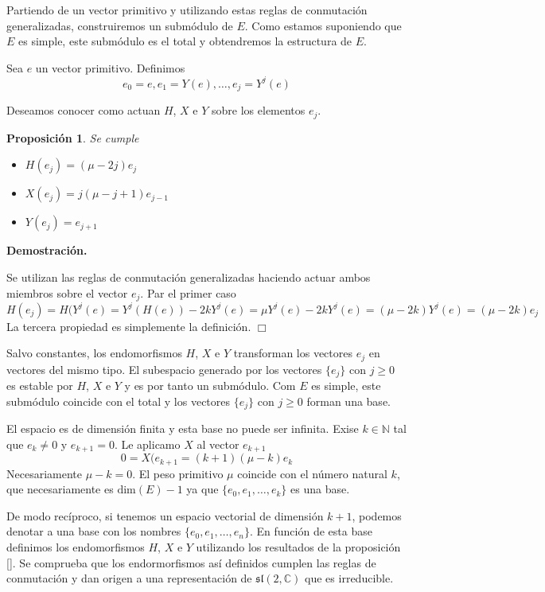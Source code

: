 \documentclass[a4paper,draft,12pt]{scrartcl}
\newtheorem{propo}[teo]{Proposición}%
\newcommand{\dem}{\noindent \textbf{Demostración. }\vspace{0.3 cm}}%
\newcommand{\C}{\mathbb{C}}%
\newcommand{\N}{\mathbb{N}}%
\newcommand{\fin}{ $\Box $ \vspace{0.4 cm}}
\begin{document}
Partiendo de un vector primitivo y utilizando estas reglas de conmutación generalizadas, construiremos un submódulo de $E$.  Como estamos suponiendo que $E$ es simple, este submódulo es el total y obtendremos la estructura de $E$.

Sea $e$ un vector primitivo. Definimos
$$
e_0=e, e_1=Y(e), \dots, e_j=Y^j(e)
$$

Deseamos conocer como actuan $H$, $X$ e $Y$ sobre los elementos $e_j$.

\begin{propo}

Se cumple

\begin{itemize}

\item $H(e_j)= (\mu-2j)e_j$

\item $X(e_j)= j(\mu-j+1)e_{j-1}$

\item $Y(e_j)= e_{j+1}$


\end{itemize}

\end{propo}

\dem

Se utilizan las reglas de conmutación generalizadas haciendo actuar ambos miembros sobre el vector $e_j$.  Par el primer caso
$$
H(e_j)= H(Y^j(e)= Y^j(H(e))-2kY^j(e)= \mu Y^j(e)-2kY^j(e)= (\mu-2k)Y^j(e)=(\mu-2k)e_j
$$
La tercera propiedad es simplemente la definición. \fin

Salvo constantes, los endomorfismos $H$, $X$ e $Y$ transforman los vectores $e_j$ en vectores del mismo tipo.  El subespacio generado por los vectores $\{e_j\}$ con $j \geq 0$ es estable por $H$, $X$ e $Y$ y es por tanto un submódulo.  Com $E$ es simple, este submódulo coincide con el total y los vectores $\{e_j\}$ con $j\geq 0$ forman una base.

El espacio es de dimensión finita y esta base no puede ser infinita.  Exise $k \in \N$ tal que $e_k\neq 0$ y $e_{k+1}=0$.  Le aplicamo $X$ al vector $e_{k+1}$
$$
0=X(e_{k+1}= (k+1)(\mu-k)e_k
$$
Necesariamente $\mu -k=0$.  El peso primitivo $\mu$ coincide con el número natural $k$, que necesariamente es $\mathrm{dim}(E)-1$ ya que $\{e_0,e_1,\dots, e_k\}$ es una base.

De modo recíproco, si tenemos un espacio vectorial de dimensión $k+1$, podemos denotar a una base con los nombres $\{e_0,e_1,\dots, e_n\}$.  En función de esta base definimos los endomorfismos $H$, $X$ e $Y$ utilizando los resultados de la proposición \ref{}.  Se comprueba que los endormorfismos así definidos cumplen las reglas de conmutación y dan origen a una representación de $\mathfrak{sl}(2,\C)$ que es irreducible.
\end{document}
